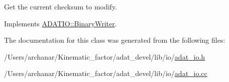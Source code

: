 Get the current checksum to modify. 



Implements \mbox{\hyperlink{classADATIO_1_1BinaryWriter_ae64230370824192d1f0dbcaa8e74017a}{A\+D\+A\+T\+I\+O\+::\+Binary\+Writer}}.



The documentation for this class was generated from the following files\+:\begin{DoxyCompactItemize}
\item 
/\+Users/archanar/\+Kinematic\+\_\+factor/adat\+\_\+devel/lib/io/\mbox{\hyperlink{lib_2io_2adat__io_8h}{adat\+\_\+io.\+h}}\item 
/\+Users/archanar/\+Kinematic\+\_\+factor/adat\+\_\+devel/lib/io/\mbox{\hyperlink{adat__io_8cc}{adat\+\_\+io.\+cc}}\end{DoxyCompactItemize}
